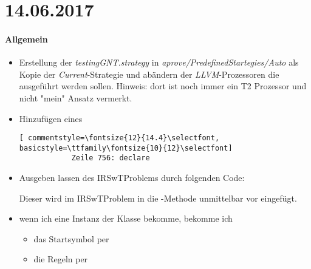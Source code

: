 \section*{14.06.2017}

\paragraph{Allgemein}
\begin{itemize}
	\item Erstellung der \emph{testingGNT.strategy} in \emph{aprove/PredefinedStartegies/Auto} als Kopie der \emph{Current}-Strategie und abändern der \emph{LLVM}-Prozessoren die ausgeführt werden sollen. Hinweis: dort ist noch immer ein T2 Prozessor und nicht "mein" Ansatz vermerkt.
	\item Hinzufügen eines
		\begin{lstlisting}[ commentstyle=\fontsize{12}{14.4}\selectfont, basicstyle=\ttfamily\fontsize{10}{12}\selectfont]
			Zeile 756: declare 
		\end{lstlisting}
	\item Ausgeben lassen des IRSwTProblems durch folgenden Code:
		
		Dieser wird im IRSwTProblem in die -Methode unmittelbar vor  eingefügt.
	\item[\label{IRSwTProblemMethoden}\textbullet] wenn ich eine Instanz der Klasse  bekomme, bekomme ich
		\begin{itemize}
			\item das Startsymbol per 
			\item die Regeln per 
		\end{itemize}
\end{itemize}

